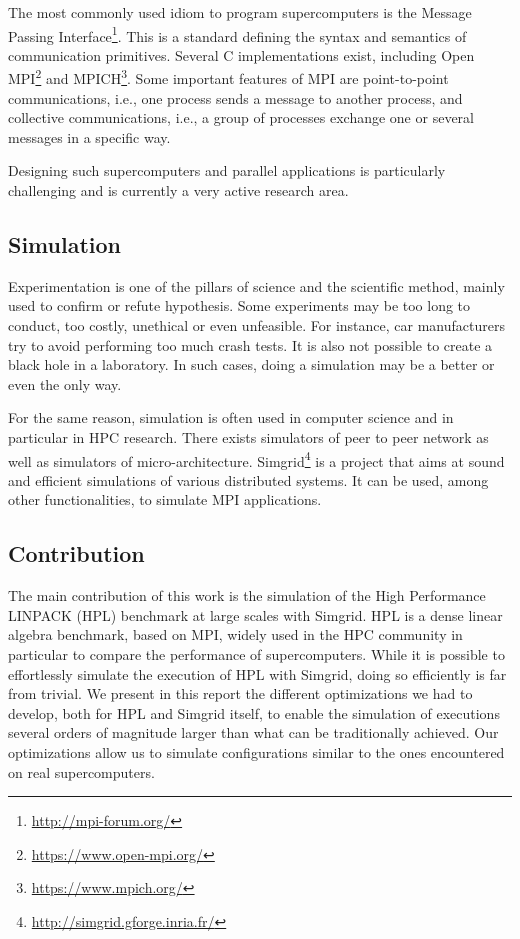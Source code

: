 \documentclass[12pt, a4paper]{memoir}
\begin{document}
The most commonly used idiom to program supercomputers is the Message Passing Interface\footnote{\url{http://mpi-forum.org/}}. This is a standard
defining the syntax and semantics of communication primitives. Several C implementations exist, including Open
MPI\footnote{\url{https://www.open-mpi.org/}} and MPICH\footnote{\url{https://www.mpich.org/}}. Some important features of MPI are point-to-point communications, i.e., one
process sends a message to another process, and collective communications, i.e., a group of processes exchange one or
several messages in a specific way.

Designing such supercomputers and parallel applications is particularly challenging and is currently a very active
research area.
\subsection{Simulation}
\label{sec:org37962c7}
Experimentation is one of the pillars of science and the scientific method, mainly used to confirm or refute
hypothesis. Some experiments may be too long to conduct, too costly, unethical or even unfeasible. For instance, car
manufacturers try to avoid performing too much crash tests. It is also not possible to create a black hole in a
laboratory. In such cases, doing a simulation may be a better or even the only way.

For the same reason, simulation is often used in computer science and in particular in HPC research. There exists
simulators of peer to peer network as well as simulators of micro-architecture. Simgrid\footnote{\url{http://simgrid.gforge.inria.fr/}} is a project
that aims at sound and efficient simulations of various distributed systems. It can be used, among other
functionalities, to simulate MPI applications.
\subsection{Contribution}
\label{sec:orgb2f02f5}
The main contribution of this work is the simulation of the High Performance LINPACK (HPL) benchmark at large
scales with Simgrid. HPL is a dense linear algebra benchmark, based on MPI, widely used in the HPC community in
particular to compare the performance of supercomputers. While it is possible to effortlessly simulate the execution
of HPL with Simgrid, doing so efficiently is far from trivial. We present in this report the different optimizations
we had to develop, both for HPL and Simgrid itself, to enable the simulation of executions several orders of
magnitude larger than what can be traditionally achieved. Our optimizations allow us to simulate configurations
similar to the ones encountered on real supercomputers.
\end{document}
